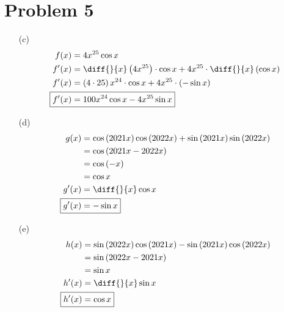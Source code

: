 \documentclass{article}
\begin{document}
\section*{Problem 5}
\begin{itemize}
\item[(c)]
    \begin{align*}
        f(x)&=4x^{25}\cos x \\
        f'(x)&=\diff{}{x}\left(4x^{25}\right)\cdot\cos x+4x^{25}\cdot\diff{}{x}\left(\cos x\right) \\
        f'(x)&=\left(4\cdot25\right)x^{24}\cdot\cos x+4x^{25}\cdot\left(-\sin x\right) \\
        \Aboxed{f'(x)&=100x^{24}\cos x-4x^{25}\sin x} \\
    \end{align*}

\item[(d)]
    \begin{align*}
        g(x)&=\cos\left(2021x\right)\cos\left(2022x\right)+\sin\left(2021x\right)\sin\left(2022x\right) \\
        &=\cos\left(2021x-2022x\right) \\
        &=\cos\left(-x\right) \\
        &=\cos x \\
        g'(x)&=\diff{}{x}\cos x \\
        \Aboxed{g'(x)&=-\sin x} \\
    \end{align*}

\item[(e)]
    \begin{align*}
        h(x)&=\sin\left(2022x\right)\cos\left(2021x\right)-\sin\left(2021x\right)\cos\left(2022x\right) \\
        &=\sin\left(2022x-2021x\right) \\
        &=\sin x \\
        h'(x)&=\diff{}{x}\sin x \\
        \Aboxed{h'(x)&=\cos x} \\
    \end{align*}
\end{itemize}
\end{document}
